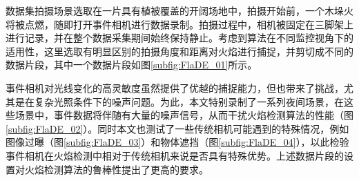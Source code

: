 数据集拍摄场景选取在一片具有植被覆盖的开阔场地中，拍摄开始前，一个木垛火将被点燃，随即打开事件相机进行数据录制。拍摄过程中，相机被固定在三脚架上进行记录，并在整个数据采集期间始终保持静止。考虑到算法在不同监控视角下的适用性，这里选取有明显区别的拍摄角度和距离对火焰进行捕捉，并剪切成不同的数据片段，其中一个数据片段如图\ref{subfig:FlaDE_01}所示。

事件相机对光线变化的高灵敏度虽然提供了优越的捕捉能力，但也带来了挑战，尤其是在复杂光照条件下的噪声问题。为此，本文特别录制了一系列夜间场景，在这些场景中，事件数据将伴随有大量的噪声信号，从而干扰火焰检测算法的性能（图\ref{subfig:FlaDE_02}）。同时本文也测试了一些传统相机可能遇到的特殊情况，例如图像过曝（图\ref{subfig:FlaDE_03}）和物体遮挡（图\ref{subfig:FlaDE_04}），以此检验事件相机在火焰检测中相对于传统相机来说是否具有特殊优势。上述数据片段的设置对火焰检测算法的鲁棒性提出了更高的要求。

